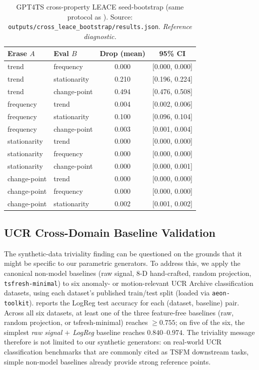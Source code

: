 \documentclass{article}
\begin{document}
\begin{table}[htbp]
\caption{GPT4TS cross-property LEACE seed-bootstrap (same protocol as
). Source: \texttt{outputs/cross\_leace\_bootstrap/results.json}. \emph{Reference diagnostic.}}
\label{tab:cross_leace_gpt4ts_bootstrap}
\centering
\small
\begin{tabular}{llcc}
\toprule
Erase $A$ & Eval $B$ & Drop (mean) & 95\% CI \\
\midrule
trend         & frequency      & 0.000 & [0.000, 0.000] \\
trend         & stationarity   & 0.210 & [0.196, 0.224] \\
trend         & change-point   & 0.494 & [0.476, 0.508] \\
frequency     & trend          & 0.004 & [0.002, 0.006] \\
frequency     & stationarity   & 0.100 & [0.096, 0.104] \\
frequency     & change-point   & 0.003 & [0.001, 0.004] \\
stationarity  & trend          & 0.000 & [0.000, 0.000] \\
stationarity  & frequency      & 0.000 & [0.000, 0.000] \\
stationarity  & change-point   & 0.000 & [0.000, 0.001] \\
change-point  & trend          & 0.000 & [0.000, 0.000] \\
change-point  & frequency      & 0.000 & [0.000, 0.000] \\
change-point  & stationarity   & 0.002 & [0.001, 0.002] \\
\bottomrule
\end{tabular}
\end{table}

\subsection{UCR Cross-Domain Baseline Validation}
\label{sec:ucr_validation}

The synthetic-data triviality finding can be questioned on the grounds that it
might be specific to our parametric generators. To address this, we apply the
canonical non-model baselines (raw signal, 8-D hand-crafted, random projection,
\texttt{tsfresh-minimal}) to six anomaly- or motion-relevant UCR Archive
classification datasets, using each dataset's published train/test split (loaded
via \texttt{aeon-toolkit}).  reports the LogReg test
accuracy for each (dataset, baseline) pair. Across all six datasets, at least
one of the three feature-free baselines (raw, random projection, or tsfresh-minimal)
reaches $\geq 0.755$; on five of the six, the simplest \emph{raw signal $+$ LogReg}
baseline reaches $0.840$--$0.974$. The triviality message therefore is not
limited to our synthetic generators: on real-world UCR classification benchmarks
that are commonly cited as TSFM downstream tasks, simple non-model baselines
already provide strong reference points.
\end{document}
